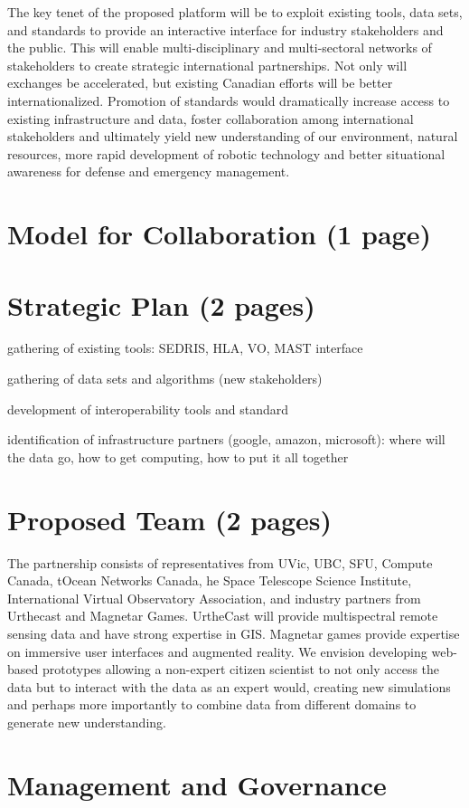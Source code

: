 \documentclass[pdftex,12pt]{article}
\begin{document}
The key tenet of the proposed platform will be to exploit existing
tools, data sets, and standards to provide an interactive interface
for industry stakeholders and the public.  This will enable
multi-disciplinary and multi-sectoral networks of stakeholders to
create strategic international partnerships. Not only will exchanges
be accelerated, but existing Canadian efforts will be better
internationalized.  Promotion of standards would dramatically increase
access to existing infrastructure and data, foster collaboration among
international stakeholders and ultimately yield new understanding of
our environment, natural resources, more rapid development of robotic
technology and better situational awareness for defense and emergency
management.

\section{Model for Collaboration (1 page)}

\section{Strategic Plan (2 pages)}

gathering of existing tools: SEDRIS, HLA, VO, MAST interface

gathering of data sets and algorithms (new stakeholders)

development of interoperability tools and standard

identification of infrastructure partners (google, amazon, microsoft):
where will the data go, how to get computing, how to put it all together

\section{Proposed Team (2 pages)}

The partnership consists of representatives from UVic, UBC, SFU,
Compute Canada, tOcean Networks Canada, he Space Telescope Science
Institute, International Virtual Observatory Association, and industry
partners from Urthecast and Magnetar Games.  UrtheCast will provide
multispectral remote sensing data and have strong expertise in GIS.
Magnetar games provide expertise on immersive user interfaces and
augmented reality.  We envision developing web-based prototypes
allowing a non-expert citizen scientist to not only access the data
but to interact with the data as an expert would, creating new
simulations and perhaps more importantly to combine data from
different domains to generate new understanding.

\section{ Management and Governance }
\end{document}
